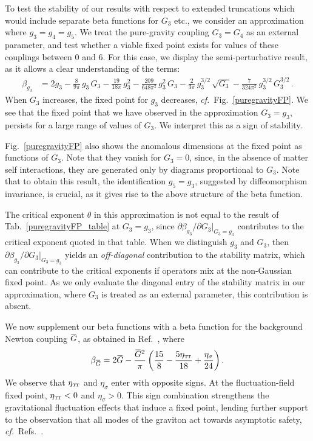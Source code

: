 \documentclass[11pt]{book}
\newcommand{\overbar}[1]{\mkern 1.5mu\overline{\mkern-1.5mu#1\mkern-1.5mu}\mkern 1.5mu}
\newcommand\TTspace{ -1pt }
\newcommand\etaTT{ \eta_{\scriptscriptstyle{\mathrm{T\hspace{\TTspace}T}}} }
\newcommand\Gback{ \overbar{G} } %
\newcommand\cf{\textit{cf.}\ }
\numberwithin{equation}{chapter}
\begin{document}
To test the stability of our results with respect to extended truncations which would include separate
beta functions for $G_3$ etc.,
we consider an approximation where $g_3=g_4=g_5$.
We treat the pure-gravity coupling $G_3=G_4$ as an external parameter,
and test whether a viable fixed point exists for values of these couplings between 0 and 6.
For this case, we display the semi-perturbative result, as it allows a clear understanding of the terms:
\begin{align}
  \beta_{g_3} &= 2 g_3
  - \frac{8}{9 \pi}       \, g_3       \, G_3
  - \frac{19}{18 \pi}     \, g_3^2
  - \frac{209}{648 \pi^2} \, g_3^2     \, G_3
  - \frac{2}{3 \pi}       \, g_3^{3/2} \, \sqrt{G_3}
  - \frac{7}{324 \pi^2}   \, g_3^{3/2} \, G_3^{3/2} \,.
\end{align}
When $G_3$ increases, the fixed point for $g_3$ decreases, \cf Fig.~\ref{puregravityFP}.
We see that the fixed point that we have observed in the approximation $G_3=g_3$,
persists for a large range of values of $G_3$.
We interpret this as a sign of stability.

Fig.~\ref{puregravityFP} also shows the anomalous dimensions at the fixed point as functions of $G_3$.
Note that they vanish for $G_3=0$, since, in the absence of matter self interactions, they are
generated only by diagrams proportional to $G_3$.
Note that to obtain this result, the identification $g_5=g_3$,
suggested by diffeomorphism invariance, is crucial,
as it gives rise to the above structure of the beta function.

The critical exponent $\theta$ in this approximation is not equal to the result of
Tab.~\ref{puregravityFP_table} at $G_3=g_3$,
since $\partial \beta_{g_3}/\partial G_3 \vert_{G_3=g_3}$ contributes to the critical
exponent quoted in that table. When we distinguish $g_3$ and $G_3$,
then  $\partial \beta_{g_3}/\partial G_3 \vert_{G_3=g_3}$ yields an \emph{off-diagonal} contribution
to the stability matrix, which can contribute to the critical exponents if operators mix
at the non-Gaussian fixed point. As we only evaluate the diagonal entry of the stability
matrix in our approximation, where $G_3$ is treated as an external parameter, this contribution is absent.

We now supplement our beta functions with a beta function for the background Newton coupling $\Gback$,
as obtained in Ref.~\cite{Percacci:2015wwa}, where
\begin{align}
  \beta_{\Gback} = 2 \Gback - \frac{\Gback^2}{\pi}
  \left(
    \frac{15}{8} - \frac{5 \etaTT}{18 } + \frac{\eta_{\sigma}}{24}
  \right).
\end{align}
We observe that $\etaTT$ and $\eta_{\sigma}$ enter with opposite signs.
At the fluctuation-field fixed point, $\etaTT<0$  and $\eta_{\sigma}>0$.
This sign combination strengthens the gravitational fluctuation effects that induce a fixed point,
lending further support to the observation that all modes of the graviton act towards asymptotic
safety, \cf Refs.~\cite{Reuter:2008qx, Reuter:2008wj}.
\end{document}
